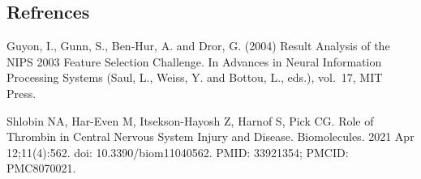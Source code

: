 \documentclass[
]{article}
\begin{document}
\subsection{Refrences}\label{refrences}

Guyon, I., Gunn, S., Ben-Hur, A. and Dror, G. (2004) Result Analysis of
the NIPS 2003 Feature Selection Challenge. In Advances in Neural
Information Processing Systems (Saul, L., Weiss, Y. and Bottou, L.,
eds.), vol.~17, MIT Press.

Shlobin NA, Har-Even M, Itsekson-Hayosh Z, Harnof S, Pick CG. Role of
Thrombin in Central Nervous System Injury and Disease. Biomolecules.
2021 Apr 12;11(4):562. doi: 10.3390/biom11040562. PMID: 33921354; PMCID:
PMC8070021.
\end{document}
